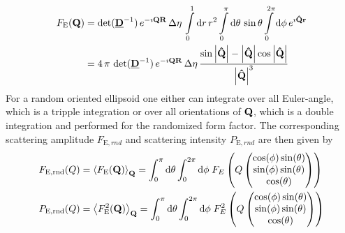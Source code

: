 \begin{align}
F_\mathrm{E}({\bf Q}) &=
\det({\underline{\bf D}}^{-1})\, e^{-\imath{\bf QR}}\, \Delta\eta\, \int\limits_0^1
\mathrm{d}r\, r^2 \int\limits_0^{\pi} \mathrm{d}\theta\, \sin \theta \int\limits_0^{2\pi}
\mathrm{d}\phi \, e^{\imath{\bf\hat{Q}r}} \nonumber \\
&=
\displaystyle 4\, \pi\, \det({\underline{\bf D}}^{-1})\, e^{-\imath{\bf QR}}\,
\Delta\eta\, \frac{\sin {\left\vert{\bf\hat{Q}}\right\vert}-
{\left\vert{\bf\hat{Q}}\right\vert}\cos {\left\vert{\bf\hat{Q}}\right\vert}}{{\left\vert{\bf\hat{Q}}\right\vert}^3}
\label{eq:form:E}
\end{align}
For a random oriented ellipsoid one either can integrate over all Euler-angle, which is a tripple integration or over all orientations of ${\bf Q}$, which is a double integration and performed for the randomized form factor. The corresponding scattering amplitude $F_{\mathrm{E},rnd}$ and scattering intensity $P_{\mathrm{E},rnd}$ are then given by
\begin{align}
F_{\mathrm{E,rnd}}(Q) &= \left\langle F_\mathrm{E}({\bf Q})\right\rangle_{\bf Q} = \int_0^\pi\mathrm{d}\theta \int_0^{2\pi}\mathrm{d}\phi \; F_E\left(Q\begin{pmatrix}
                                       \cos(\phi)\sin(\theta) \\
                                       \sin(\phi)\sin(\theta) \\
                                       \cos(\theta)
                                     \end{pmatrix}\right) \\
P_{\mathrm{E,rnd}}(Q) &= \left\langle F_\mathrm{E}^2({\bf Q})\right\rangle_{\bf Q} = \int_0^\pi\mathrm{d}\theta \int_0^{2\pi}\mathrm{d}\phi \; F_E^2\left(Q\begin{pmatrix}
                                       \cos(\phi)\sin(\theta) \\
                                       \sin(\phi)\sin(\theta) \\
                                       \cos(\theta)
                                     \end{pmatrix}\right)
\end{align}

